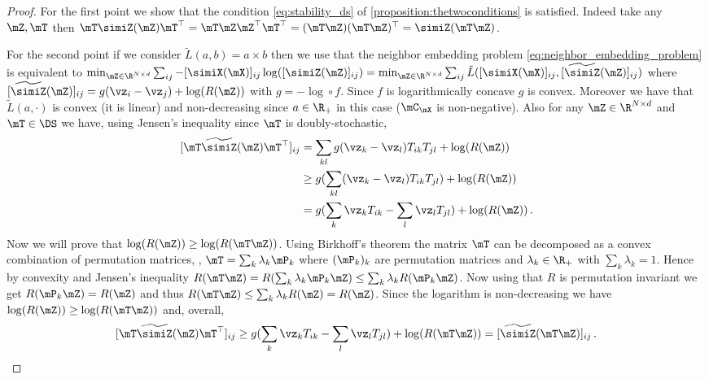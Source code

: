 \begin{proof}
	For the first point we show that the condition \cref{eq:stability_ds} of \cref{proposition:thetwoconditions} is satisfied. Indeed take any $\mZ, \mT$ then $\mT \simiZ(\mZ) \mT^\top = \mT \mZ \mZ^\top \mT^\top = (\mT \mZ)(\mT \mZ)^\top = \simiZ(\mT \mZ)$.
	
	For the second point if we consider $\tilde L(a,b) = a\times b$ then we use that the neighbor embedding problem \cref{eq:neighbor_embedding_problem} is equivalent to $\min_{\mZ \in \R^{N \times d}} \sum_{ij} - [\simiX(\mX)]_{ij}\log([\simiZ(\mZ)]_{ij}) = \min_{\mZ \in \R^{N \times d}} \sum_{ij} \tilde{L}([\simiX(\mX)]_{ij}, [\widetilde{\simiZ}(\mZ)]_{ij})$ where $[\widetilde{\simiZ}(\mZ)]_{ij} = g(\vz_i-\vz_j) + \log(R(\mZ))$ with $g = -\log \circ f$. Since $f$ is logarithmically concave $g$ is convex. Moreover we have that $\tilde{L}(a, \cdot)$ is convex (it is linear) and non-decreasing since $a \in \R_+$ in this case ($\mC_\mX$ is non-negative). Also for any $\mZ \in \R^{N \times d}$ and $\mT \in \DS$ we have, using Jensen's inequality since $\mT$ is doubly-stochastic,
	\begin{equation}
		\begin{split}
			[\mT \widetilde{\simiZ}(\mZ) \mT^\top]_{ij} &= \sum_{kl} g(\vz_k-\vz_l) T_{ik} T_{jl} + \log(R(\mZ)) \\
			&\geq  g(\sum_{kl}(\vz_k-\vz_l) T_{ik} T_{jl}) + \log(R(\mZ))\\
			&= g(\sum_{k} \vz_k T_{ik} - \sum_{l} \vz_l T_{jl})+ \log(R(\mZ))\,.
		\end{split}
	\end{equation}
	Now we will prove that $\log(R(\mZ)) \geq \log(R(\mT \mZ))$. Using Birkhoff's theorem \citep{birkhoff1946tres} the matrix $\mT$ can be decomposed as a convex combination of permutation matrices, \ie,  $\mT = \sum_k \lambda_k \mP_k$ where $(\mP_k)_k$ are permutation matrices and $\lambda_k \in \R_{+}$ with $\sum_{k} \lambda_k = 1$. Hence by convexity and Jensen's inequality $R(\mT \mZ) = R(\sum_k \lambda_k \mP_k \mZ) \leq \sum_{k} \lambda_k R(\mP_k \mZ)$. Now using that $R$ is permutation invariant we get $R(\mP_k \mZ) = R(\mZ)$ and thus $R(\mT \mZ) \leq \sum_k \lambda_k R(\mZ) = R(\mZ)$. Since the logarithm is non-decreasing we have $\log(R(\mZ)) \geq \log(R(\mT \mZ))$ and, overall,
	\begin{equation}
		\begin{split}
			[\mT \widetilde{\simiZ}(\mZ) \mT^\top]_{ij} \geq  g(\sum_{k} \vz_k T_{ik} - \sum_{l} \vz_l T_{jl}) + \log(R(\mT \mZ)) = [\widetilde{\simiZ}(\mT\mZ)]_{ij}\,.

\end{split}
\end{equation}
\end{proof}
